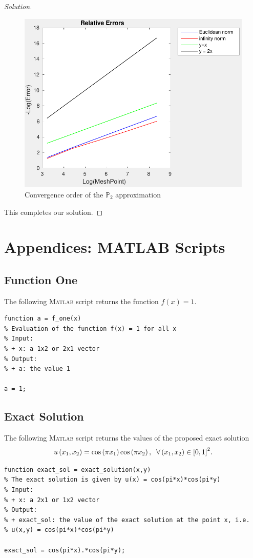 \documentclass[11pt,a4paper,center,notitlepage]{article}
\numberwithin{equation}{section}
\begin{document}
\begin{proof}[Solution]
\begin{figure}[H]
\centering
\includegraphics[scale=0.9]{convergence_order_P2}
\caption{Convergence order of the $\mathbb{P}_2$ approximation}
\end{figure}
This completes our solution.
\end{proof}


\section{Appendices: MATLAB Scripts}

\subsection{Function One}
The following \textsc{Matlab} script returns the function $f\left(x\right)=1$. 
\begin{verbatim}
function a = f_one(x)
% Evaluation of the function f(x) = 1 for all x 
% Input: 
% + x: a 1x2 or 2x1 vector
% Output:
% + a: the value 1

a = 1;
\end{verbatim}

\subsection{Exact Solution}
The following \textsc{Matlab} script returns the values of the proposed exact solution 
\begin{align}
u\left( {{x_1},{x_2}} \right) = \cos \left( {\pi {x_1}} \right)\cos \left( {\pi {x_2}} \right),\hspace{2mm}\forall \left( {{x_1},{x_2}} \right) \in {\left[ {0,1} \right]^2}.
\end{align}
\begin{verbatim}
function exact_sol = exact_solution(x,y)
% The exact solution is given by u(x) = cos(pi*x)*cos(pi*y)
% Input:
% + x: a 2x1 or 1x2 vector
% Output:
% + exact_sol: the value of the exact solution at the point x, i.e. 
% u(x,y) = cos(pi*x)*cos(pi*y)

exact_sol = cos(pi*x).*cos(pi*y);
\end{verbatim}
\end{document}
